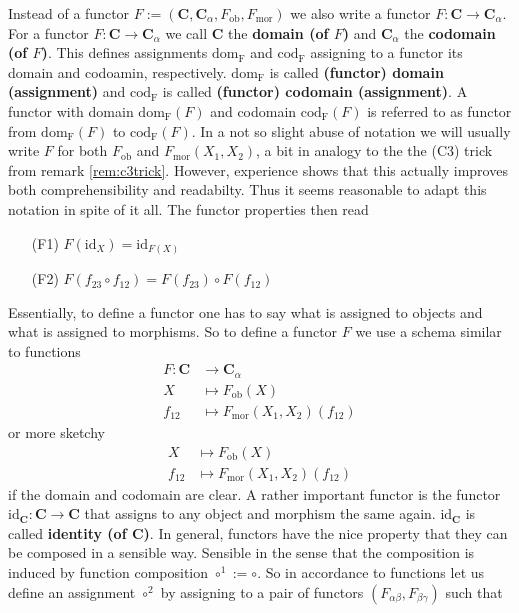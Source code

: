 Instead of {\glqq}a functor $F := (\mathbf{C},\mathbf{C}_{\alpha},F_{\mathrm{ob}},F_{\mathrm{mor}})${\grqq} we also write {\glqq}a functor $F \colon \mathbf{C} \rightarrow \mathbf{C}_{\alpha}${\grqq}. For a functor $F \colon \mathbf{C} \rightarrow \mathbf{C}_{\alpha}$ we call $\mathbf{C}$ the \textbf{domain (of $F$)} and $\mathbf{C}_{\alpha}$ the \textbf{codomain (of $F$)}. This defines assignments $\mathrm{dom_{F}}$ and $\mathrm{cod_{F}}$ assigning to a functor its domain and codoamin, respectively. $\mathrm{dom_{F}}$ is called \textbf{(functor) domain (assignment)} and $\mathrm{cod_{F}}$ is called \textbf{(functor) codomain (assignment)}. A functor with domain $\mathrm{dom_{F}}(F)$ and codomain $\mathrm{cod_{F}}(F)$ is referred to as functor from $\mathrm{dom_{F}}(F)$ to $\mathrm{cod_{F}}(F)$. In a not so slight abuse of notation we will usually write $F$ for both $F_{\mathrm{ob}}$ and $F_{\mathrm{mor}}(X_{1},X_{2})$, a bit in analogy to the the (C3) trick from remark \ref{rem:c3trick}. However, experience shows that this actually improves both comprehensibility and readabilty. Thus it seems reasonable to adapt this notation in spite of it all. The functor properties then read
\begin{enumerate}
\item[(F1)]
$F(\mathrm{id}_{X}) = \mathrm{id}_{F(X)}$
\item[(F2)]
$F(f_{23} \circ f_{12}) = F(f_{23}) \circ F(f_{12})$
\end{enumerate}
Essentially, to define a functor one has to say what is assigned to objects and what is assigned to morphisms. So to define a functor $F$ we use a schema similar to functions
\begin{align*}
  F
  \colon
  \mathbf{C}
  &\rightarrow
  \mathbf{C}_{\alpha}
  \\
  X
  &\mapsto
  F_{\mathrm{ob}}(X)
  \\
  f_{12}
  &\mapsto
  F_{\mathrm{mor}}(X_{1},X_{2})(f_{12})
\end{align*}
or more sketchy
\begin{align*}
  X
  &\mapsto
  F_{\mathrm{ob}}(X)
  \\
  f_{12}
  &\mapsto
  F_{\mathrm{mor}}(X_{1},X_{2})(f_{12})
\end{align*}
if the domain and codomain are clear. A rather important functor is the functor $\mathrm{id}_{\mathbf{C}} \colon \mathbf{C} \rightarrow \mathbf{C}$ that assigns to any object and morphism the same again. $\mathrm{id}_{\mathbf{C}}$ is called \textbf{identity (of $\mathbf{C}$)}. In general, functors have the nice property that they can be composed in a sensible way. Sensible in the sense that the composition is induced by function composition $\circ^{1} := \circ$. So in accordance to functions let us define an assignment $\circ^{2}$ by assigning to a pair of functors $(F_{\alpha\beta},F_{\beta\gamma})$ such that
